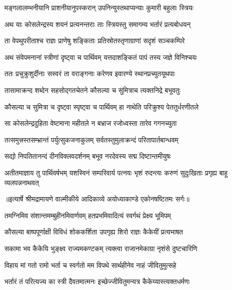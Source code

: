 \twolineshloka
{मङ्गलालम्भनीयानि प्राशनीयानुपस्करान्}
{उपनिन्युस्तथाप्यन्याः कुमारी बहुलाः स्त्रियः} %

\twolineshloka
{अथ याः कोसलेन्द्रस्य शयनं प्रत्यनन्तराः}
{ताः स्त्रियस्तु समागम्य भर्तारं प्रत्यबोधयन्} %

\twolineshloka
{ता वेपथुपरीताश्च राज्ञः प्राणेषु शङ्किताः}
{प्रतिस्रोतस्तृणाग्राणां सदृशं सञ्चकम्पिरे} %

\twolineshloka
{अथ संवेपमनानां स्त्रीणां दृष्ट्वा च पार्थिवम्}
{यत्तदाशङ्कितं पापं तस्य जज्ञे विनिश्चयः} %

\twolineshloka
{ततः प्रचुक्रुशुर्दीनाः सस्वरं ता वराङ्गनाः}
{करेणव इवारण्ये स्थानप्रच्युतयूथपाः} %

\twolineshloka
{तासामाक्रन्द शब्देन सहसोद्गतचेतने}
{कौसल्या च सुमित्राच त्यक्तनिद्रे बभूवतुः} %

\twolineshloka
{कौसल्या च सुमित्रा च दृष्ट्वा स्पृष्ट्वा च पार्थिवम्}
{हा नाथेति परिक्रुश्य पेततुर्धरणीतले} %

\twolineshloka
{सा कोसलेन्द्रदुहिता वेष्टमाना महीतले}
{न बभ्राज रजोध्वस्ता तारेव गगनच्युता} %

\twolineshloka
{तत्समुत्त्रस्तसम्भ्रान्तं पर्युत्सुकजनाकुलम्}
{सर्वतस्तुमुलाक्रन्दं परितापार्तबान्धवम्} %

\twolineshloka
{सद्यो निपतितानन्दं दीनविक्लवदर्शनम्}
{बभूव नरदेवस्य सद्म दिष्टान्तमीयुषः} %

\fourlineindentedshloka
{अतीतमाज्ञाय तु पार्थिवर्षभम्}
{यशस्विनं सम्परिवार्य पत्नयः}
{भृशं रुदन्त्यः करुणं सुदुःखिताः}
{प्रगृह्य बाहू व्यलपन्ननाथवत्} %


{॥इत्यार्षे श्रीमद्रामायणे वाल्मीकीये आदिकाव्ये अयोध्याकाण्डे एकोनषष्टितमः सर्गः॥}


\twolineshloka
{तमग्निमिव संशान्तमम्बुहीनमिवार्णवम्}
{हतप्रभमिवादित्यं स्वर्गथं प्रेक्ष्य भूमिपम्} %

\twolineshloka
{कौसल्या बाष्पपूर्णाक्षी विविधं शोककर्शिता}
{उपगृह्य शिरो राज्ञः कैकेयीं प्रत्यभाषत} %

\twolineshloka
{सकामा भव कैकेयि भुङ्क्ष्व राज्यमकण्टकम्}
{त्यक्त्वा राजानमेकाग्रा नृशंसे दुष्टचारिणि} %

\twolineshloka
{विहाय मां गतो रामो भर्ता च स्वर्गतो मम}
{विपथे सार्थहीनेव नाहं जीवितुमुत्सहे} %

\twolineshloka
{भर्तारं तं परित्यज्य का स्त्री दैवतमात्मनः}
{इच्छेज्जीवितुमन्यत्र कैकेय्यास्त्यक्तधर्मणः} %

